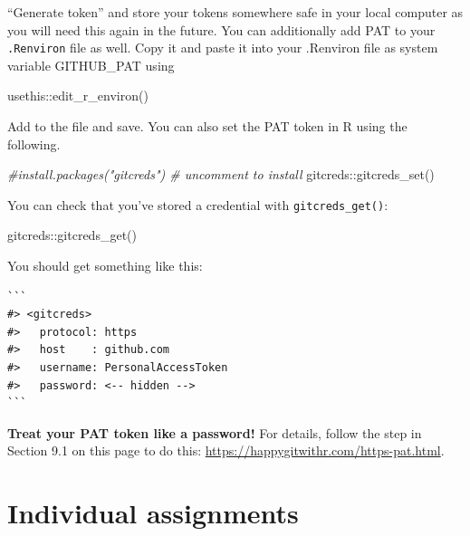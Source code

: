 \documentclass[
]{book}
\newenvironment{Shaded}{\begin{snugshade}}{\end{snugshade}}
\newcommand{\CommentTok}[1]{\textcolor[rgb]{0.56,0.35,0.01}{\textit{#1}}}
\newcommand{\FunctionTok}[1]{\textcolor[rgb]{0.00,0.00,0.00}{#1}}
\newcommand{\NormalTok}[1]{#1}
\newcommand{\SpecialCharTok}[1]{\textcolor[rgb]{0.00,0.00,0.00}{#1}}
\begin{document}
\begin{enumerate}
  ``Generate token'' and store your tokens somewhere safe in your local computer as you will need this again in the future. You can additionally add PAT to your \texttt{.Renviron} file as well. Copy it and paste it into your .Renviron file as system variable GITHUB\_PAT using

\begin{Shaded}
\begin{Highlighting}[]
\NormalTok{usethis}\SpecialCharTok{::}\FunctionTok{edit\_r\_environ}\NormalTok{()}
\end{Highlighting}
\end{Shaded}

  Add to the file and save. You can also set the PAT token in R using the following.

\begin{Shaded}
\begin{Highlighting}[]
\CommentTok{\#install.packages("gitcreds") \# uncomment to install}
\NormalTok{gitcreds}\SpecialCharTok{::}\FunctionTok{gitcreds\_set}\NormalTok{()}
\end{Highlighting}
\end{Shaded}

  You can check that you've stored a credential with \texttt{gitcreds\_get()}:

\begin{Shaded}
\begin{Highlighting}[]
\NormalTok{gitcreds}\SpecialCharTok{::}\FunctionTok{gitcreds\_get}\NormalTok{()}
\end{Highlighting}
\end{Shaded}
\end{enumerate}

You should get something like this:

\begin{verbatim}
```
#> <gitcreds>
#>   protocol: https
#>   host    : github.com
#>   username: PersonalAccessToken
#>   password: <-- hidden -->
```
\end{verbatim}

\textbf{Treat your PAT token like a password!} For details, follow the step in Section 9.1 on this page to do this: \url{https://happygitwithr.com/https-pat.html}.

\hypertarget{individual-assignments}{%
\section{Individual assignments}\label{individual-assignments}}
\end{document}

